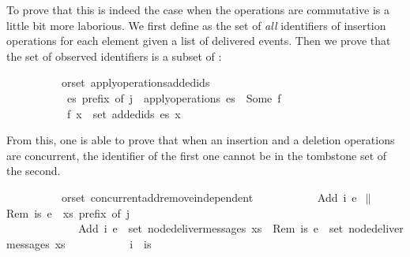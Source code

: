 \noindent To prove that this is indeed the case when the operations are
commutative is a little bit more laborious. We first define  as
the set of \emph{all} identifiers of insertion operations for each element
given a list of delivered events.  Then we prove that the set of observed
identifiers is a subset of :

\vspace{0.35em}
\begin{isabellebody}
\ \ \ \ \ \ \ \ \ {\isacharparenleft}\ orset{\isacharparenright}\ apply{\isacharunderscore}operations{\isacharunderscore}added{\isacharunderscore}ids{\isacharcolon}\isanewline
\ \ \ \ \ \ \ \ \ \ \ {\isachardoublequoteopen}es\ prefix\ of\ j{\isachardoublequoteclose}\ \ {\isachardoublequoteopen}apply{\isacharunderscore}operations\ es\ {\isacharequal}\ Some\ f{\isachardoublequoteclose}\isanewline
\ \ \ \ \ \ \ \ \ \ \ {\isachardoublequoteopen}f\ x\ {\isasymsubseteq}\ set\ {\isacharparenleft}added{\isacharunderscore}ids\ es\ x{\isacharparenright}{\isachardoublequoteclose}
\end{isabellebody}
\vspace{0.35em}

\noindent From this, one is able to prove that when an insertion and a deletion
operations are concurrent, the identifier of the first one cannot be
in the tombstone set of the second.

\vspace{0.35em}
\begin{isabellebody}
\ \ \ \ \ \ \ \ \ {\isacharparenleft}\ orset{\isacharparenright}\ concurrent{\isacharunderscore}add{\isacharunderscore}remove{\isacharunderscore}independent{\isacharcolon}\isanewline
\ \ \ \ \ \ \ \ \ \ \ {\isachardoublequoteopen}{\isacharparenleft}Add\ i\ e{}{\isacharparenright}\ $\|$ {\isacharparenleft}Rem\ is\ e{}{\isacharparenright}{\isachardoublequoteclose}\ \ {\isachardoublequoteopen}xs\ prefix\ of\ j{\isachardoublequoteclose}\isanewline
\ \ \ \ \ \ \ \ \ \ \ \ \ {\isachardoublequoteopen}Add\ i\ e{}\ {\isasymin}\ set\ {\isacharparenleft}node{\isacharunderscore}deliver{\isacharunderscore}messages\ xs{\isacharparenright}{\isachardoublequoteclose}\ \ {\isachardoublequoteopen}Rem\ is\ e{}\ {\isasymin}\ set\ {\isacharparenleft}node{\isacharunderscore}deliver{\isacharunderscore}messages\ xs{\isacharparenright}{\isachardoublequoteclose}\isanewline
\ \ \ \ \ \ \ \ \ \ \ {\isachardoublequoteopen}i\ {\isasymnotin}\ is{\isachardoublequoteclose}
\end{isabellebody}
\vspace{0.35em}


